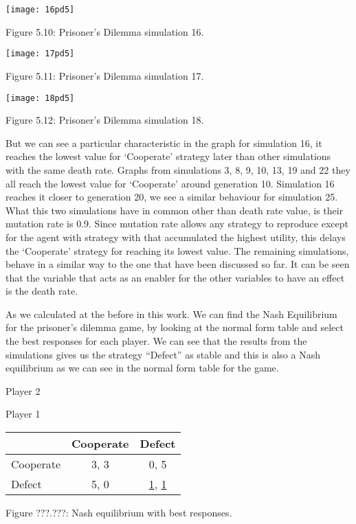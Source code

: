 \documentclass{article}
\begin{document}
\begin{center}
	\texttt{[image: 16pd5]}
	
Figure 5.10: Prisoner's Dilemma simulation 16.
	
	\texttt{[image: 17pd5]}
	
Figure 5.11: Prisoner's Dilemma simulation 17.

	\texttt{[image: 18pd5]}

Figure 5.12: Prisoner's Dilemma simulation 18.
\end{center}

But we can see a particular characteristic in the graph for simulation 16, it reaches the lowest value for `Cooperate' strategy later than other simulations with the same death rate. Graphs from simulations 3, 8, 9, 10, 13, 19 and 22 they all reach the lowest value for `Cooperate' around generation 10. Simulation 16 reaches it closer to generation 20, we see a similar behaviour for simulation 25. What this two simulations have in common other than death rate value, is their mutation rate is 0.9. Since mutation rate allows any strategy to reproduce except for the agent with strategy with that accumulated the highest utility, this delays the `Cooperate' strategy for reaching its lowest value.		  
The remaining simulations, behave in a similar way to the one that have been discussed  so far. It can be seen that the variable that acts as an enabler for the other variables to have an effect is the death rate. 




As we calculated at the before in this work. We can find the Nash Equilibrium for the prisoner's dilemma game, by looking at the normal form table and select the best responses for each player. We can see that the results from the simulations gives us the strategy ``Defect'' as stable and this is also a Nash equilibrium as we can see in the normal form table for the game.
\begin{center}
Player 2

Player 1
\begin{tabular}{|l|c|c|}
\hline
 & Cooperate & Defect\\ 
\hline
Cooperate & 3, 3 & 0, 5\\
\hline
Defect & 5, 0 & \underline{1}, \underline{1}\\
\hline
\end{tabular}

Figure ???.???: Nash equilibrium with best responses.
\end{center}
\end{document}
